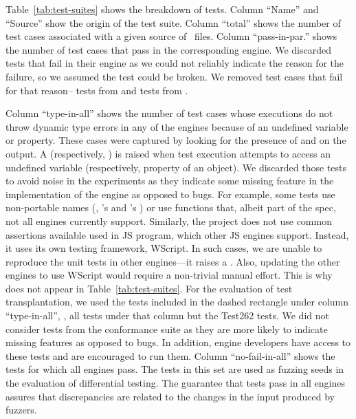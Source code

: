 \documentclass[smallextended]{svjour3}
\begin{document}
Table~\ref{tab:test-suites} shows the breakdown of tests. Column
``Name'' and ``Source'' show the origin of the test suite. Column
``total'' shows the number of test cases associated with a given
source of \js\ files. Column ``pass-in-par.''  shows the number of
test cases that pass in the corresponding engine. We discarded tests
that fail in their engine as we could not reliably indicate the reason
for the failure, so we assumed the test could be broken. We removed
\testsThatFail{} test cases that fail for that
reason--\testsThatFailJSC{} tests from \jsc and \testsThatFailSM{}
tests from \smonkey.

Column ``type-in-all'' shows the number of test cases whose executions
do not throw dynamic type errors in any of the engines because of an
undefined variable or property.  These cases were captured by looking
for the presence of  and  on
the output. A  (respectively,
) is raised when test execution attempts to access
an undefined variable (respectively, property of an object). We
discarded those tests to avoid noise in the experiments as they
indicate some missing feature in the implementation of the engine as
opposed to bugs. For example, some tests use non-portable names
(\eg{}, \jsc's  and \smonkey{}'s
) or use functions that, albeit part of the
spec, not all engines currently support. Similarly, the \chakra
project does not use common assertions available used in JS program,
which other JS engines support. Instead, it uses its own testing
framework, WScript. In such cases, we are unable to reproduce the
\chakra unit tests in other engines---it raises a
. Also, updating the other engines to use
WScript would require a non-trivial manual effort. This is why \chakra
does not appear in Table~\ref{tab:test-suites}. For the evaluation of
test transplantation, we used the
\totalTestFilesForTestTransplantation{} tests included in the dashed
rectangle under column ``type-in-all'', \ie{}, all tests under that
column but the Test262 tests. We did not consider tests from the
conformance suite as they are more likely to indicate missing features
as opposed to bugs. In addition, engine developers have access to
these tests and are encouraged to run them.
Column ``no-fail-in-all'' shows the tests for which all engines
pass. The tests in this set are used as fuzzing seeds in the
evaluation of differential testing. The guarantee that tests pass in
all engines assures that discrepancies are related to the changes in
the input produced by fuzzers.
\end{document}
